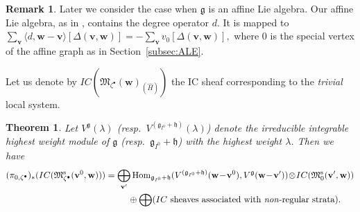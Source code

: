 \documentclass[11pt]{article}
\newtheorem{Theorem}[equation]{Theorem}
\theoremstyle{definition}
\newtheorem{Remark}[equation]{Remark}
\numberwithin{equation}{section}
\newcommand{\subsecref}[1]{Section~\ref{#1}}
\newcommand{\g}{{\mathfrak g}}
\newcommand{\Hom}{\operatorname{Hom}}
\newcommand{\M}{{\mathfrak M}} %
\newcommand{\Mreg}{\M^{\operatorname{s}}}
\newcommand{\bv}{{\mathbf v}} %
\newcommand{\bw}{{\mathbf w}} %
\begin{document}
\begin{Remark}\label{rem:degree}
  Later we consider the case when $\g$ is an af\/f\/ine Lie algebra. Our
  af\/f\/ine Lie algebra, as in \cite{Kac}, contains the degree operator
  $d$. It is mapped to
\(
   \sum_\bv \langle d, \bw - \bv\rangle [\Delta(\bv,\bw)]
   = - \sum_{\bv} v_0[\Delta(\bv,\bw)],
\)
where $0$ is the special vertex of the af\/f\/ine graph as in
\subsecref{subsec:ALE}.
\end{Remark}

Let us denote by $IC(\M_{\zeta^\bullet}(\bw)_{(\widehat H)})$ the IC
sheaf corresponding to the {\it trivial\/} local system.

\begin{Theorem}\label{thm:branch}
  Let $V^\g(\lambda)$ \textup(resp.\ $V^{(\g_{I^0}+\mathfrak
    h)}(\lambda)$\textup) denote the irreducible integrable highest
  weight module of $\g$ \textup(resp.\ $\g_{I^0}+\mathfrak h$\textup)
  with the highest weight $\lambda$. Then we have
  \begin{gather*}
    (\pi_{0,\zeta^\bullet})_*(IC(\Mreg_{\zeta^\bullet}(\bv^0,\bw)))
   =
    \bigoplus_{\bv'}
    \Hom_{\g_{I^0}+\mathfrak
    h}(V^{(\g_{I^0}+\mathfrak h)}(\bw \!-\! \bv^0), V^\g(\bw\!-\!\bv'))
  \!\otimes\! IC(\Mreg_0(\bv',\bw))
  \\
  \phantom{(\pi_{0,\zeta^\bullet})_*(IC(\Mreg_{\zeta^\bullet}(\bv^0,\bw)))=}{} \oplus
  \bigoplus (\text{\rm
    $IC$ sheaves associated with {\it non\/}-regular strata}).
  \end{gather*}
\end{Theorem}
\end{document}
